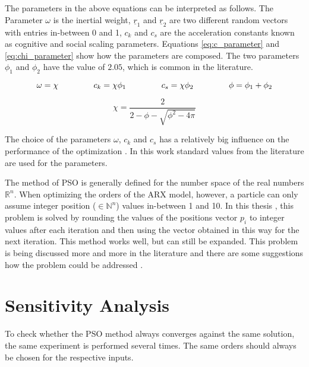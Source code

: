 The parameters in the above equations can be interpreted as follows. The Parameter $\omega$ is the inertial weight, $\underline{r}_1$ and $\underline{r}_2$ are two different random vectors with entries in-between 0 and 1, $c_k$ and $c_s$ are the acceleration constants known as cognitive and social scaling parameters. Equations \ref{eq:c_parameter} and \ref{eq:chi_parameter} show how the parameters are composed. The two parameters $\phi_1$ and $\phi_2$ have the value of $2.05$, which is common in the literature.

 \begin{equation}
	\omega = \chi \hspace{1.5cm} c_k = \chi \phi_1 \hspace{1.5cm} c_s = \chi \phi_2 \hspace{1.5cm} \phi = \phi_1 + \phi_2
	\label{eq:c_parameter}
\end{equation}

 \begin{equation}
	\chi = \dfrac{2}{2-\phi-\sqrt{\phi^2-4\pi}}
	\label{eq:chi_parameter}
\end{equation}

The choice of the parameters $\omega$, $c_k$ and $c_s$ has a relatively big influence on the performance of the optimization \cite{Shi_1998,Taherkhani_2016}. In this work standard values from the literature are used for the parameters.

The method of PSO is generally defined for the number space of the real numbers $\mathbb{R}^n$. When optimizing the orders of the ARX model, however, a particle can only assume integer position ($\in \mathbb{N}^n$) values in-between 1 and 10. In this thesis , this problem is solved by rounding the values of the positions vector $p_i$ to integer values after each iteration and then using the vector obtained in this way for the next iteration. This method works well, but can still be expanded. This problem is being discussed more and more in the literature and there are some suggestions how the problem could be addressed \cite{Kennedy_1997,Lee_2008,Unler_2010}.



\section{Sensitivity Analysis}
\label{sec:sensitivity_analysis}

To check whether the PSO method always converges against the same solution, the same experiment is performed several times. The same orders should always be chosen for the respective inputs.

